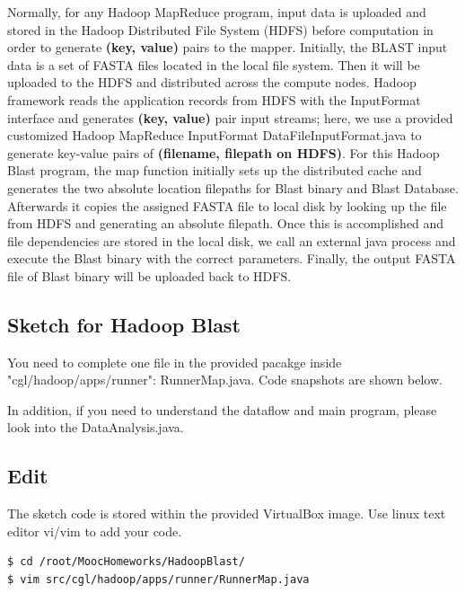 Normally, for any Hadoop MapReduce program, input data is uploaded and stored
in the Hadoop Distributed File System (HDFS) before computation in order to
generate \textbf{(key, value)} pairs to the mapper. Initially, the BLAST input
data is a set of FASTA files located in the local file system. Then it will be
uploaded to the HDFS and distributed across the compute nodes. Hadoop framework
reads the application records from HDFS with the InputFormat interface and
generates \textbf{(key, value)} pair input streams; here, we use a provided
customized Hadoop MapReduce InputFormat DataFileInputFormat.java to generate
key-value pairs of \textbf{(filename, filepath on HDFS)}. For this Hadoop Blast
program, the map function initially sets up the distributed cache and generates
the two absolute location filepaths for Blast binary and Blast Database.
Afterwards it copies the assigned FASTA file to local disk by looking up the
file from HDFS and generating an absolute filepath. Once this is accomplished
and file dependencies are stored in the local disk, we call an external java
process and execute the Blast binary with the correct parameters. Finally, the
output FASTA file of Blast binary will be uploaded back to HDFS.

\subsection*{Sketch for Hadoop Blast}
You need to complete one file in the provided pacakge inside
"cgl/hadoop/apps/runner": RunnerMap.java. Code snapshots are shown below.



In addition, if you need to understand the dataflow and main program, please
look into the DataAnalysis.java.




\subsection*{Edit}
The sketch code is stored within the provided VirtualBox image. Use linux text
editor vi/vim to add your code.

\begin{lstlisting}[language=bash]
$ cd /root/MoocHomeworks/HadoopBlast/
$ vim src/cgl/hadoop/apps/runner/RunnerMap.java
\end{lstlisting}


